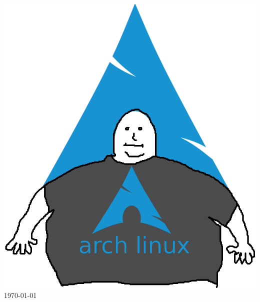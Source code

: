 \begin{titlepage}
\begin{center}
            \includegraphics[scale=0.3]{Img/title.jpg}\\[1.5cm]
            \vspace*{1\baselineskip}
            \today \\[0.7cm]
        \end{center}
    \end{titlepage}
    \tableofcontents
    \clearpage 



    
